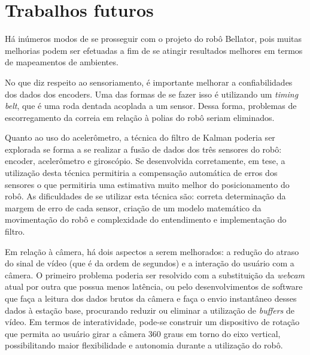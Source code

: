 \chapter{Trabalhos futuros}
Há inúmeros modos de se prosseguir com o projeto do robô Bellator, pois muitas melhorias podem ser efetuadas a fim de se atingir resultados melhores em termos de mapeamentos de ambientes.

No que diz respeito ao sensoriamento, é importante melhorar a confiabilidades dos dados dos encoders. Uma das formas de se fazer isso é utilizando um \textit{timing belt}, que é uma roda dentada acoplada a um sensor. Dessa forma, problemas de escorregamento da correia em relação à polias do robô seriam eliminados.

Quanto ao uso do acelerômetro, a técnica do filtro de Kalman poderia ser explorada se forma a se realizar a fusão de dados dos três sensores do robô: encoder, acelerômetro e giroscópio. Se desenvolvida corretamente, em tese, a utilização desta técnica permitiria a compensação automática de erros dos sensores o que permitiria uma estimativa muito melhor do posicionamento do robô. As dificuldades de se utilizar esta técnica são: correta determinação da margem de erro de cada sensor, criação de um modelo matemático da movimentação do robô e complexidade do entendimento e implementação do filtro.

Em relação à câmera, há dois aspectos a serem melhorados: a redução do atraso do sinal de vídeo (que é da ordem de segundos) e a interação do usuário com a câmera. O primeiro problema poderia ser resolvido com a substituição da \textit{webcam} atual por outra que possua menos latência, ou pelo desenvolvimentos de software que faça a leitura dos dados brutos da câmera e faça o envio instantâneo desses dados à estação base, procurando reduzir ou eliminar a utilização de \textit{buffers} de vídeo. Em termos de interatividade, pode-se construir um dispositivo de rotação que permita ao usuário girar a câmera 360 graus em torno do eixo vertical, possibilitando maior flexibilidade e autonomia durante a utilização do robô.
